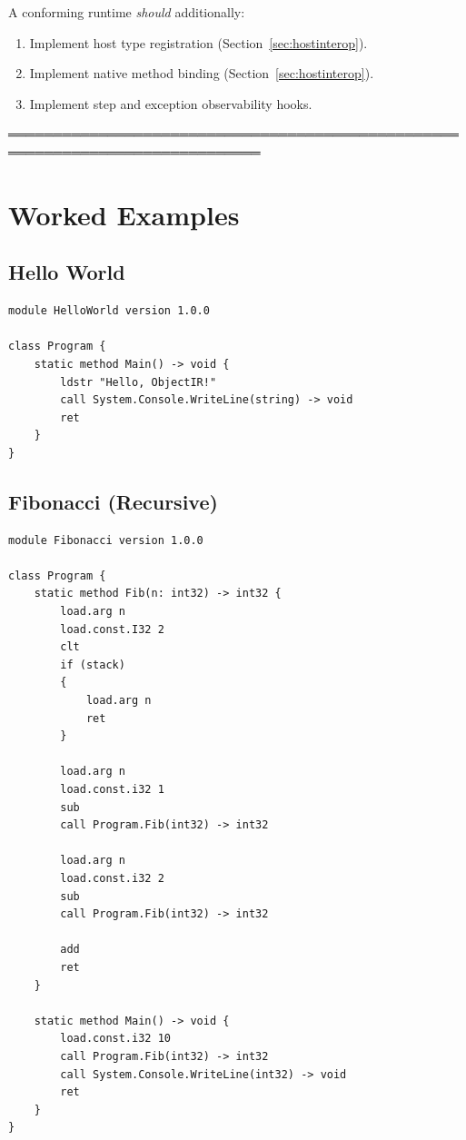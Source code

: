 \documentclass[11pt,a4paper]{article}
\begin{document}
A conforming runtime \textit{should} additionally:

\begin{enumerate}[leftmargin=2em, resume]
	\item Implement host type registration (Section~\ref{sec:hostinterop}).
	\item Implement native method binding (Section~\ref{sec:hostinterop}).
	\item Implement step and exception observability hooks.
\end{enumerate}

 ══════════════════════════════════════════════════════════════════════════════
\section{Worked Examples}

\subsection{Hello World}

\begin{lstlisting}[style=textir, caption={Hello World in TextIR}]
module HelloWorld version 1.0.0

class Program {
    static method Main() -> void {
        ldstr "Hello, ObjectIR!"
        call System.Console.WriteLine(string) -> void
        ret
    }
}
\end{lstlisting}

\subsection{Fibonacci (Recursive)}

\begin{lstlisting}[style=textir, caption={Recursive Fibonacci}]
module Fibonacci version 1.0.0

class Program {
    static method Fib(n: int32) -> int32 {
        load.arg n
        load.const.I32 2
        clt
        if (stack) 
        {
         	load.arg n
         	ret
        }

        load.arg n
        load.const.i32 1
        sub
        call Program.Fib(int32) -> int32

        load.arg n
        load.const.i32 2
        sub
        call Program.Fib(int32) -> int32

        add
        ret
    }

    static method Main() -> void {
        load.const.i32 10
        call Program.Fib(int32) -> int32
        call System.Console.WriteLine(int32) -> void
        ret
    }
}
\end{lstlisting}
\end{document}
